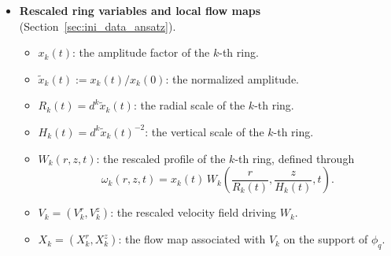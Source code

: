 \documentclass[reqno,11pt]{amsart}
\begin{document}
\begin{itemize}
\item \textbf{Rescaled ring variables and local flow maps}
(Section~\ref{sec:ini_data_ansatz}).
\begin{itemize}
    \item $x_k(t)$: the amplitude factor of the $k$-th ring.
    \item $\tilde x_k(t):=x_k(t)/x_k(0)$: the normalized amplitude.
    \item $R_k(t)=d^k\tilde x_k(t)$: the radial scale of the $k$-th ring.
    \item $H_k(t)=d^k\tilde x_k(t)^{-2}$: the vertical scale of the $k$-th ring.
    \item $W_k(r,z,t)$: the rescaled profile of the $k$-th ring, defined through
    \[
        \omega_k(r,z,t)=x_k(t)\,
        W_k\!\left(\frac{r}{R_k(t)},\frac{z}{H_k(t)},t\right).
    \]
    \item $V_k=(V_k^r,V_k^z)$: the rescaled velocity field driving $W_k$.
    \item $X_k=(X_k^r,X_k^z)$: the flow map associated with $V_k$ on the support of $\phi_q$.
\end{itemize}


\end{itemize}
\end{document}
